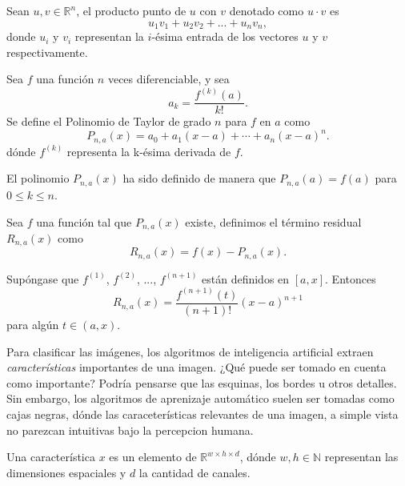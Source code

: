     \begin{definition}
        Sean $u,v\in \mathbb R^n$, el producto punto de $u$ con $v$ denotado como $u\cdot v$ es
        \begin{equation}
            u_1v_1 + u_2v_2 + ... + u_nv_n,
        \end{equation}
        donde $u_i$ y $v_i$ representan la $i$-ésima entrada de los vectores $u$ y $v$ respectivamente.
    \end{definition}
    \begin{definition}
        Sea $f$ una función $n$ veces diferenciable, y sea $$a_k = \frac{f^{(k)}(a)}{k!}.$$
        Se define el Polinomio de Taylor de grado $n$ para $f$ en $a$ como
        $$P_{n,a}(x) = a_0 + a_1(x-a) + \cdots + a_n(x-a)^n.$$
        dónde $f^{(k)}$ representa la k-ésima derivada de $f$.
    \end{definition}
    El polinomio $P_{n,a}(x)$ ha sido definido de manera que $P_{n,a}(a) = f(a)$ para $0\leq k \leq n$.
    \begin{definition}
        Sea $f$ una función tal que $P_{n,a}(x)$ existe, definimos el término  residual $R_{n,a}(x)$ como 
        \begin{equation}
            R_{n,a}(x) = f(x) - P_{n,a}(x).
        \end{equation} 
    \end{definition}
    \begin{theorem}
        Supóngase que $f^{(1)}$, $f^{(2)}$, ..., $f^{(n+1)}$ están definidos en $[a,x]$. Entonces 
        \begin{equation}
            R_{n,a}(x) = \frac{f^{(n+1)}(t)}{(n+1)!}(x-a)^{n+1}
        \end{equation}
        para algún $t\in (a,x)$.
    \end{theorem}
    Para clasificar las imágenes, los algoritmos de inteligencia artificial extraen \textsl{características} importantes de una imagen. ¿Qué puede ser tomado en cuenta como importante? Podría pensarse que las esquinas, los bordes u otros detalles. Sin embargo, los algoritmos de aprenizaje automático suelen ser tomadas como cajas negras, dónde las caraceterísticas relevantes de una imagen, a simple vista no parezcan intuitivas bajo la percepcion humana.
    \begin{definition}[Característica]
        Una característica $x$ es un elemento de $\mathbb R^{w\times h\times d}$, dónde $w,h\in \mathbb N$ representan las dimensiones espaciales y $d$ la cantidad de canales.
    \end{definition} 
    
